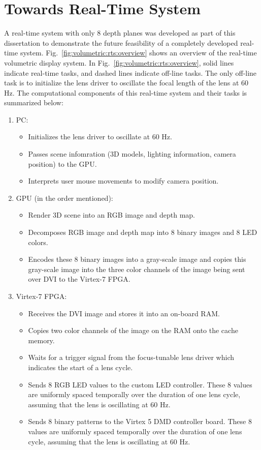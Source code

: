 \section{Towards Real-Time System}
\label{sec:volumetric:rts}


A real-time system with only 8 depth planes was developed as part of this dissertation to demonstrate the future feasibility of a completely developed real-time system.
Fig.~\ref{fig:volumetric:rts:overview} shows an overview of the real-time volumetric display system.
In Fig.~\ref{fig:volumetric:rts:overview}, solid lines indicate real-time tasks, and dashed lines indicate off-line tasks.
The only off-line task is to initialize the lens driver to oscillate the focal length of the lens at 60 Hz. 
The computational components of this real-time system and their tasks is summarized below:

\begin{enumerate}
    \item PC:
    \begin{itemize}
        \item Initializes the lens driver to oscillate at 60 Hz. 
        \item Passes scene infomration (3D models, lighting information, camera position) to the GPU.
        \item Interprets user mouse movements to modify camera position.
    \end{itemize}
    \item GPU (in the order mentioned):
    \begin{itemize}
        \item Render 3D scene into an RGB image and depth map.
        \item Decomposes RGB image and depth map into 8 binary images and 8 LED colors.
        \item Encodes these 8 binary images into a gray-scale image and copies this gray-scale image into the three color channels of the image being sent over DVI to the Virtex-7 FPGA.
    \end{itemize}
    \item Virtex-7 FPGA:
    \begin{itemize}
        \item Receives the DVI image and stores it into an on-board RAM.
        \item Copies two color channels of the image on the RAM onto the cache memory.
        \item Waits for a trigger signal from the focus-tunable lens driver which indicates the start of a lens cycle.
        \item Sends 8 RGB LED values to the custom LED controller. These 8 values are uniformly spaced temporally over the duration of one lens cycle, assuming that the lens is oscillating at 60 Hz.
        \item Sends 8 binary patterns to the Virtex 5 DMD controller board. These 8 values are uniformly spaced temporally over the duration of one lens cycle, assuming that the lens is oscillating at 60 Hz.
    \end{itemize}
\end{enumerate}

